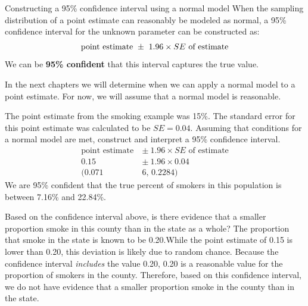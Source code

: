 \begin{onebox}{Constructing a 95\% confidence interval using a normal model}
When the sampling distribution of a point estimate can reasonably be modeled as normal, a 95\% confidence interval for the unknown parameter can be constructed as: \vspace{-2mm}
\begin{align}
\text{point estimate}\ \pm\ 1.96 \times SE\text{ of estimate}\vspace{-2mm}
\label{95PercentConfidenceIntervalFormula}
\end{align}
We can be \textbf{95\% confident} that this interval captures the true value.\end{onebox}

In the next chapters we will determine when we can apply a normal model to a point estimate. For now, we will assume that a normal model is reasonable. 

\begin{examplewrap}
\begin{nexample}{The point estimate from the smoking example was 15\%. The standard error for this point estimate was calculated to be $SE = 0.04$. Assuming that conditions for a normal model are met, construct and interpret a 95\% confidence interval.  }
\begin{align*}
\text{point estimate}\ &\pm \ 1.96\times SE \text{ of estimate} \\
0.15\  &\pm \ 1.96\times 0.04\\
(0.071&6\text{, } 0.2284)
\end{align*}
We are 95\% confident that the true percent of smokers in this population is between 7.16\% and 22.84\%.
\end{nexample}
\end{examplewrap}

\begin{examplewrap}
\begin{nexample}{Based on the confidence interval above, is there evidence that a smaller proportion smoke in this county than in the state as a whole? The proportion that smoke in the state is known to be 0.20.}While the point estimate of 0.15 is lower than 0.20, this deviation is likely due to random chance. Because the confidence interval \emph{includes} the value 0.20, 0.20 is a reasonable value for the proportion of smokers in the county. Therefore, based on this confidence interval, we do not have evidence that a smaller proportion smoke in the county than in the state.
\end{nexample}
\end{examplewrap}

